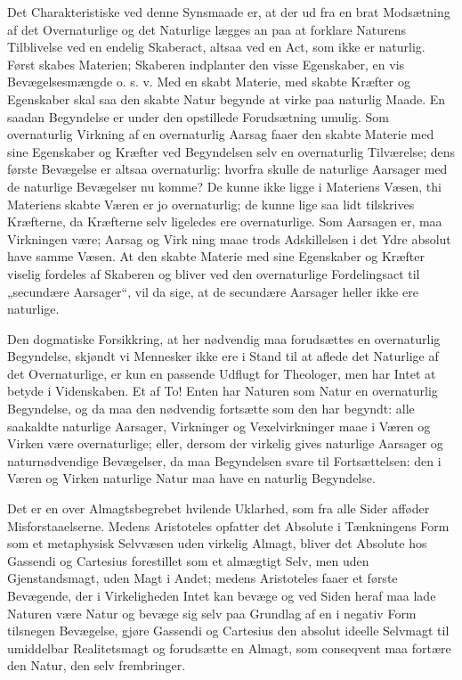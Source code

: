 \documentclass[12pt,a4paper]{book}
\begin{document}
Det Charakteristiske ved denne Synsmaade er, at der ud fra en brat
Modsætning af det Overnaturlige og det Naturlige lægges an paa at
forklare Naturens Tilblivelse ved en endelig Skaberact, altsaa ved en
Act, som ikke er naturlig. Først skabes Materien; Skaberen indplanter
den visse Egenskaber, en vis Bevægelsesmængde o. s. v. Med en skabt
Materie, med skabte Kræfter og Egenskaber skal saa den skabte Natur
begynde at virke paa naturlig Maade. En saadan Begyndelse er under den
opstillede Forudsætning umulig. Som overnaturlig Virkning af en
overnaturlig Aarsag faaer den skabte Materie med sine Egenskaber og
Kræfter ved Begyndelsen selv en overnaturlig Tilværelse; dens første
Bevægelse er altsaa overnaturlig: hvorfra skulle de naturlige Aarsager
med de naturlige Bevægelser nu komme? De kunne ikke ligge i Materiens
Væsen, thi Materiens skabte Væren er jo overnaturlig; de kunne lige saa
lidt tilskrives Kræfterne, da Kræfterne selv ligeledes ere
overnaturlige. Som Aarsagen er, maa Virkningen være; Aarsag og Virk\-%
ning maae trods Adskillelsen i det Ydre absolut have samme Væsen. At
den skabte Materie med sine Egenskaber og Kræfter viselig fordeles af
Skaberen og bliver ved den overnaturlige Fordelingsact til „secundære
Aarsager“, vil da sige, at de secundære Aarsager heller ikke ere
naturlige.

Den dogmatiske Forsikkring, at her nødvendig maa forudsættes en
overnaturlig Begyndelse, skjøndt vi Mennesker ikke ere i Stand til at
aflede det Naturlige af det Overnaturlige, er kun en passende Udflugt
for Theologer, men har Intet at betyde i Videnskaben. Et af To! Enten
har Naturen som Natur en overnaturlig Begyndelse, og da maa den
nødvendig fortsætte som den har begyndt: alle saakaldte naturlige
Aarsager, Virkninger og Vexelvirkninger maae i Væren og Virken være
overnaturlige; eller, dersom der virkelig gives naturlige Aarsager og
naturnødvendige Bevægelser, da maa Begyndelsen svare til
Fortsættelsen: den i Væren og Virken naturlige Natur maa have en
naturlig Begyndelse.

Det er en over Almagtsbegrebet hvilende Uklarhed, som fra alle Sider
afføder Misforstaaelserne. Medens Aristoteles opfatter det Absolute i
Tænkningens Form som et metaphysisk Selvvæsen uden virkelig Almagt,
bliver det Absolute hos Gassendi og Cartesius forestillet som et
almægtigt Selv, men uden Gjenstandsmagt, uden Magt i Andet; medens
Aristoteles faaer et første Bevægende, der i Virkeligheden Intet kan
bevæge og ved Siden heraf maa lade Naturen være Natur og bevæge sig
selv paa Grundlag af en i negativ Form tilsnegen Bevægelse, gjøre
Gassendi og Cartesius den absolut ideelle Selvmagt til umiddelbar
Realitetsmagt og forudsætte en Almagt, som conseqvent maa fortære den
Natur, den selv frembringer.
\end{document}
